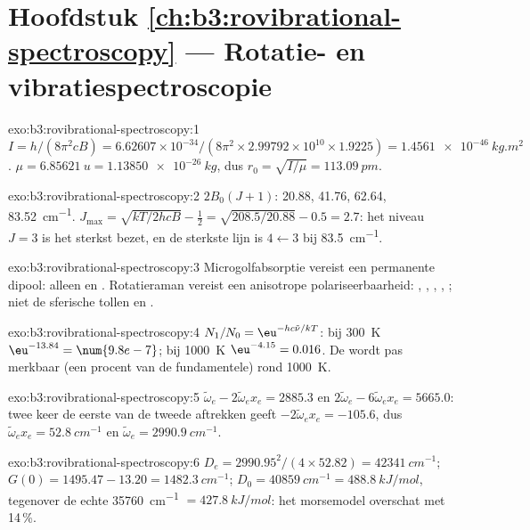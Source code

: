 \section*{Hoofdstuk \ref{ch:b3:rovibrational-spectroscopy} --- Rotatie- en vibratiespectroscopie}

\begin{solution}{exo:b3:rovibrational-spectroscopy:1}
$I = h/(8\pi^2cB) = 6.62607 \times 10^{-34}/(8\pi^2 \times 2.99792 \times 10^{10} \times
1.9225) = \qty{1.4561e-46}{kg.m^2}$. $\mu = \qty{6.85621}{u} = \qty{1.13850e-26}{kg}$, dus
$r_0 = \sqrt{I/\mu} = \qty{113.09}{pm}$.
\end{solution}

\begin{solution}{exo:b3:rovibrational-spectroscopy:2}
$2B_0(J+1)$: 20.88, 41.76, 62.64, \qty{83.52}{cm^{-1}}. $J_{\max} = \sqrt{kT/2hcB} -
\frac12 = \sqrt{208.5/20.88} - 0.5 = 2.7$: het niveau $J = 3$ is het
sterkst bezet, en de sterkste lijn is $4 \leftarrow 3$ bij \qty{83.5}{cm^{-1}}.
\end{solution}

\begin{solution}{exo:b3:rovibrational-spectroscopy:3}
Microgolfabsorptie vereist een permanente dipool: alleen  en .
Rotatieraman vereist een anisotrope polariseerbaarheid: , , ,
, ; niet de sferische tollen  en .
\end{solution}

\begin{solution}{exo:b3:rovibrational-spectroscopy:4}
$N_1/N_0 = \eu^{-hc\tilde\nu/kT}$: bij \qty{300}{K} $\eu^{-13.84} = \num{9.8e-7}$; bij
\qty{1000}{K} $\eu^{-4.15} = 0.016$. De  wordt pas merkbaar (een
procent van de fundamentele) rond \qty{1000}{K}.
\end{solution}

\begin{solution}{exo:b3:rovibrational-spectroscopy:5}
$\tilde\omega_e - 2\tilde\omega_ex_e = 2885.3$ en $2\tilde\omega_e - 6\tilde\omega_ex_e =
5665.0$: twee keer de eerste van de tweede aftrekken geeft $-2\tilde\omega_ex_e = -105.6$,
dus $\tilde\omega_ex_e = \qty{52.8}{cm^{-1}}$ en $\tilde\omega_e = \qty{2990.9}{cm^{-1}}$.
\end{solution}

\begin{solution}{exo:b3:rovibrational-spectroscopy:6}
$D_e = 2990.95^2/(4 \times 52.82) = \qty{42341}{cm^{-1}}$; $G(0) = 1495.47 - 13.20 =
\qty{1482.3}{cm^{-1}}$; $D_0 = \qty{40859}{cm^{-1}} = \qty{488.8}{kJ/mol}$, tegenover de echte
\qty{35760}{cm^{-1}} $= \qty{427.8}{kJ/mol}$: het morsemodel overschat met 14\,\%.
\end{solution}

